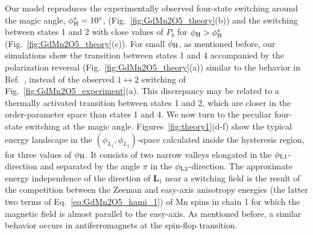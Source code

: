 Our model reproduces the experimentally observed four-state switching around the magic angle, $\phi_{\rm H}^\ast  = 10^\circ$, (Fig.~\ref{fig:GdMn2O5_theory}(b)) and the switching between states 1 and 2 with close values of $P_b$ for $\phi_{\rm H} > \phi_{\rm H}^\ast$  (Fig.~\ref{fig:GdMn2O5_theory}(c)).
For small $\phi_{\rm H}$, as mentioned before, our simulations show the transition between states 1 and 4 accompanied by the polarization reversal (Fig.~\ref{fig:GdMn2O5_theory}(a)) similar to the behavior in Ref.~\cite{Lee13}, instead of the observed $1\leftrightarrow2$ switching of Fig.~\ref{fig:GdMn2O5_experiment}(a). 
This discrepancy may be related to a thermally activated transition between states 1 and 2, which are closer in the order-parameter space than states 1 and 4. 
We now turn to the peculiar four-state switching at the magic angle.
%
Figures~\ref{fig:theory1}(d-f) show the typical energy landscape in the $(\phi_{L_1},\phi_{L_2})$-space calculated inside the hysteresis region, for three values of $\phi_{\rm H}$.
%
It consists of two narrow valleys elongated in the  $\phi_{\rm L1}$-direction and separated by the angle $\pi$ in the $\phi_{\rm L2}$-direction.
%
The approximate energy independence of the direction of $\mathbf{L}_1$ near a switching field is the result of the competition between the Zeeman and easy-axis anisotropy energies (the latter two terms of Eq.~\ref{eq:GdMn2O5_hami_1}) of Mn spins in chain 1 for which the magnetic field is almost parallel to the easy-axis.
%
As mentioned before, a similar behavior occurs in antiferromagnets at the spin-flop transition. 


